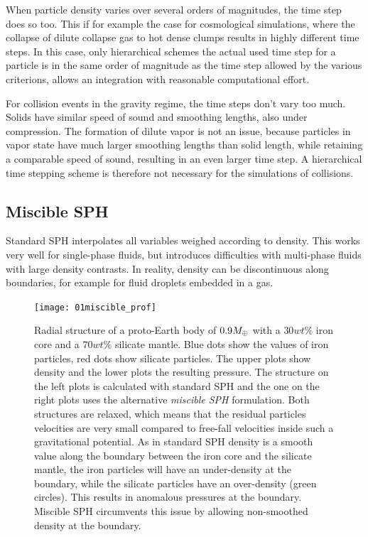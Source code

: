 When particle density varies over several orders of magnitudes, the time step does so too. This if for example the case for cosmological simulations, where the collapse of dilute collapse gas to hot dense clumps results in highly different time steps. In this case, only hierarchical schemes the actual used time step for a particle is in the same order of magnitude as the time step allowed by the various criterions, allows an integration with reasonable computational effort.

For collision events in the gravity regime, the time steps don't vary too much. Solids have similar speed of sound and smoothing lengths, also under compression. The formation of dilute vapor is not an issue, because particles in vapor state have much larger smoothing lengths than solid length, while retaining a comparable speed of sound, resulting in an even larger time step. A hierarchical time stepping scheme is therefore not necessary for the simulations of collisions.

\subsection{Miscible SPH}
Standard SPH interpolates all variables weighed according to density. This works very well for single-phase fluids, but introduces difficulties with multi-phase fluids with large density contrasts. In reality, density can be discontinuous along boundaries, for example for fluid droplets embedded in a gas. 

\begin{figure}[htbp]
\begin{center}
\texttt{[image: 01miscible\_prof]}
\caption{Radial structure of a proto-Earth body of $0.9M_{\oplus}$ with a $30wt\%$ iron core and a $70wt\%$ silicate mantle. Blue dots show the values of iron particles, red dots show silicate particles. The upper plots show density and the lower plots the resulting pressure. The structure on the left plots is calculated with standard SPH and the one on the right plots uses the alternative \emph{miscible SPH} formulation. Both structures are relaxed, which means that the residual particles velocities are very small compared to free-fall velocities inside such a gravitational potential. As in standard SPH density is a smooth value along the boundary between the iron core and the silicate mantle, the iron particles will have an under-density at the boundary, while the silicate particles have an over-density (green circles). This results in anomalous pressures at the boundary. Miscible SPH circumvents this issue by allowing non-smoothed density at the boundary.}
\label{ch02_fig01}
\end{center}
\end{figure}


